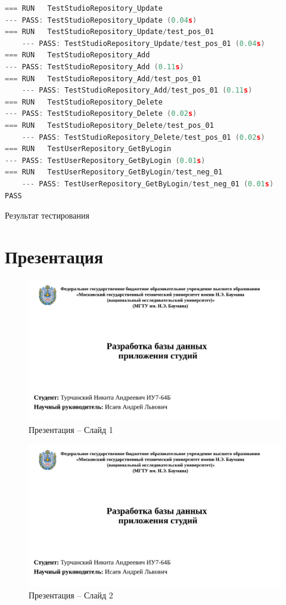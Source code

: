 \begin{appendices}
\begin{lstlisting}[language=go, label=lst:testing_res]
=== RUN   TestStudioRepository_Update
--- PASS: TestStudioRepository_Update (0.04s)
=== RUN   TestStudioRepository_Update/test_pos_01
	--- PASS: TestStudioRepository_Update/test_pos_01 (0.04s)
=== RUN   TestStudioRepository_Add
--- PASS: TestStudioRepository_Add (0.11s)
=== RUN   TestStudioRepository_Add/test_pos_01
	--- PASS: TestStudioRepository_Add/test_pos_01 (0.11s)
=== RUN   TestStudioRepository_Delete
--- PASS: TestStudioRepository_Delete (0.02s)
=== RUN   TestStudioRepository_Delete/test_pos_01
	--- PASS: TestStudioRepository_Delete/test_pos_01 (0.02s)
=== RUN   TestUserRepository_GetByLogin
--- PASS: TestUserRepository_GetByLogin (0.01s)
=== RUN   TestUserRepository_GetByLogin/test_neg_01
	--- PASS: TestUserRepository_GetByLogin/test_neg_01 (0.01s)
PASS
\end{lstlisting}
\caption{Результат тестирования}
\chapter{Презентация}
\begin{figure}[h]
	\begin{center}
		\includegraphics[page=1, width=\linewidth]{presentation.pdf}
	\end{center}
	\caption{Презентация -- Слайд 1}
\end{figure}

\begin{figure}[h]
	\begin{center}
		\includegraphics[page=2, width=\linewidth]{presentation.pdf}
	\end{center}
	\caption{Презентация -- Слайд 2}
\end{figure}


\end{appendices}
